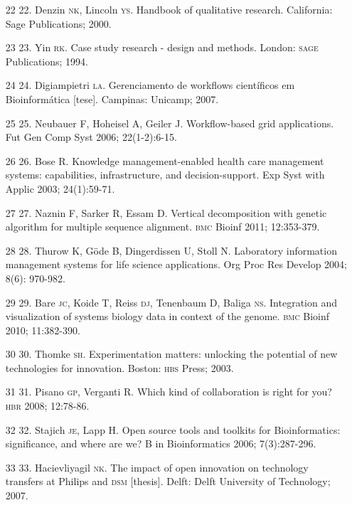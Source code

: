 \documentclass{article}
\begin{document}
\begin{itemize}
\item[22] 22. Denzin \textsc{nk}, Lincoln \textsc{ys}. Handbook of qualitative research.
California: Sage Publications; 2000.

\item[23] 23. Yin \textsc{rk}. Case study research - design and methods. London: \textsc{sage}
Publications; 1994.

\item[24] 24. Digiampietri \textsc{la}. Gerenciamento de workflows científicos em
Bioinformática [tese]. Campinas: Unicamp; 2007.

\item[25] 25. Neubauer F, Hoheisel A, Geiler J. Workflow-based grid
applications. Fut Gen Comp Syst 2006; 22(1-2):6-15.

\item[26] 26. Bose R. Knowledge management-enabled health care management
systems: capabilities, infrastructure, and decision-support. Exp Syst with
Applic 2003; 24(1):59-71.

\item[27] 27. Naznin F, Sarker R, Essam D. Vertical decomposition with genetic
algorithm for multiple sequence alignment. \textsc{bmc} Bioinf 2011; 12:353-379.

\item[28] 28. Thurow K, Göde B, Dingerdissen U, Stoll N. Laboratory information
management systems for life science applications. Org Proc Res Develop 2004;
8(6): 970-982.

\item[29] 29. Bare \textsc{jc}, Koide T, Reiss \textsc{dj}, Tenenbaum D, Baliga \textsc{ns}. Integration
and visualization of systems biology data in context of the genome. \textsc{bmc} Bioinf
2010; 11:382-390.

\item[30] 30. Thomke \textsc{sh}. Experimentation matters: unlocking the potential of new
technologies for innovation. Boston: \textsc{hbs} Press; 2003.

\item[31] 31. Pisano \textsc{gp}, Verganti R. Which kind of collaboration is right for
you? \textsc{hbr} 2008; 12:78-86.

\item[32] 32. Stajich \textsc{je}, Lapp H. Open source tools and toolkits for
Bioinformatics: significance, and where are we? B in Bioinformatics 2006;
7(3):287-296.

\item[33] 33. Hacievliyagil \textsc{nk}. The impact of open innovation on technology
transfers at Philips and \textsc{dsm} [thesis]. Delft: Delft University of Technology;
2007.


\end{itemize}
\end{document}
